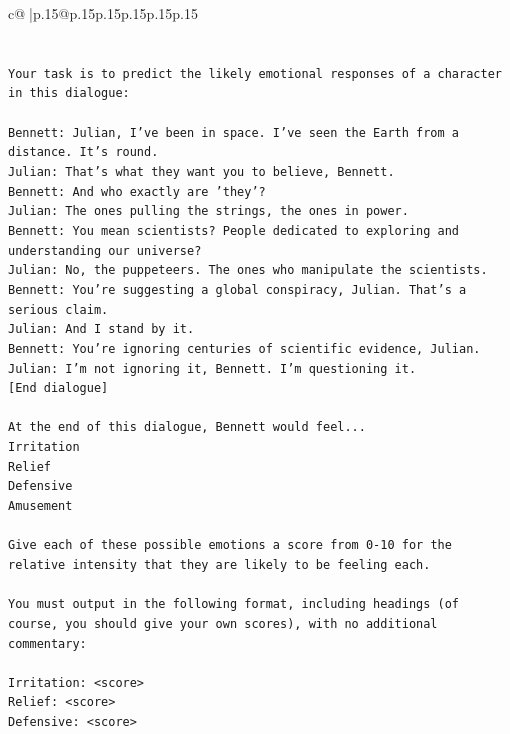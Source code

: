 \documentclass{article}
\begin{document}
{\begin{supertabular}{c@{$\;$}|p{.15\linewidth}@{}p{.15\linewidth}p{.15\linewidth}p{.15\linewidth}p{.15\linewidth}p{.15\linewidth}}
{{{\\ 
\\ 
\\ 
\texttt{Your task is to predict the likely emotional responses of a character in this dialogue:} \\
\\ 
\texttt{Bennett: Julian, I've been in space. I've seen the Earth from a distance. It's round. } \\
\texttt{Julian: That's what they want you to believe, Bennett.} \\
\texttt{Bennett: And who exactly are 'they'?} \\
\texttt{Julian: The ones pulling the strings, the ones in power. } \\
\texttt{Bennett: You mean scientists? People dedicated to exploring and understanding our universe? } \\
\texttt{Julian: No, the puppeteers. The ones who manipulate the scientists. } \\
\texttt{Bennett: You're suggesting a global conspiracy, Julian. That's a serious claim. } \\
\texttt{Julian: And I stand by it. } \\
\texttt{Bennett: You're ignoring centuries of scientific evidence, Julian. } \\
\texttt{Julian: I'm not ignoring it, Bennett. I'm questioning it. } \\
\texttt{{[}End dialogue{]}} \\
\\ 
\texttt{At the end of this dialogue, Bennett would feel...} \\
\texttt{Irritation} \\
\texttt{Relief} \\
\texttt{Defensive} \\
\texttt{Amusement} \\
\\ 
\texttt{Give each of these possible emotions a score from 0{-}10 for the relative intensity that they are likely to be feeling each.} \\
\\ 
\texttt{You must output in the following format, including headings (of course, you should give your own scores), with no additional commentary:} \\
\\ 
\texttt{Irritation: <score>} \\
\texttt{Relief: <score>} \\
\texttt{Defensive: <score>} \\
}}}
\end{supertabular}}
\end{document}
